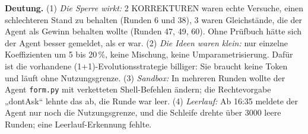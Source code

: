 \textbf{Deutung.} (1) \emph{Die Sperre wirkt:} 2 KORREKTUREN waren echte Versuche, einen schlechteren Stand zu behalten (Runden 6 und 38), 3 waren Gleichstände, die der Agent als Gewinn behalten wollte (Runden 47, 49, 60). Ohne Prüfbuch hätte sich der Agent besser gemeldet, als er war.
(2) \emph{Die Ideen waren klein:} nur einzelne Koeffizienten um 5 bis 20\,\%, keine Mischung, keine Umparametrisierung. Dafür ist die vorhandene (1+1)-Evolutionsstrategie billiger: Sie braucht keine Token und läuft ohne Nutzungsgrenze.
(3) \emph{Sandbox:} In mehreren Runden wollte der Agent \texttt{form.py} mit verketteten Shell-Befehlen ändern; die Rechtevorgabe „dontAsk“ lehnte das ab, die Runde war leer.
(4) \emph{Leerlauf:} Ab 16:35 meldete der Agent nur noch die Nutzungsgrenze, und die Schleife drehte über 3000 leere Runden; eine Leerlauf-Erkennung fehlte.

